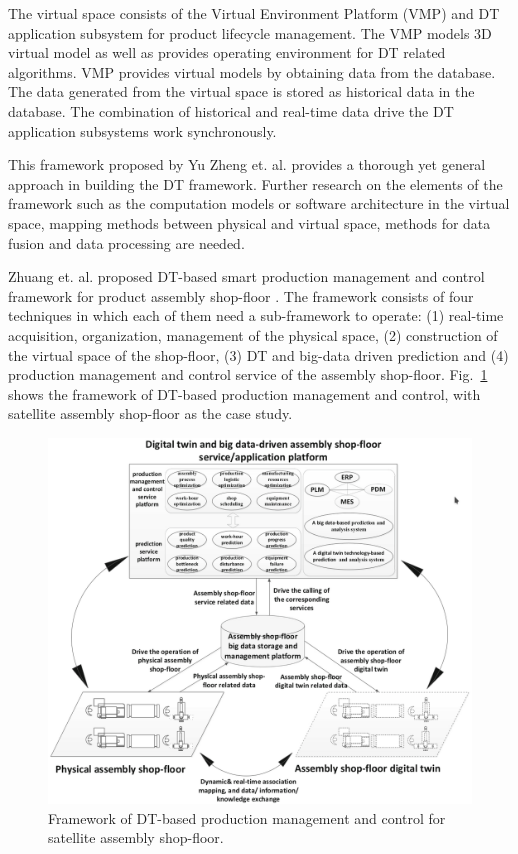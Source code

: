 \documentclass[article]{aaltoseries}
\begin{document}
The virtual space consists of the Virtual Environment Platform (VMP) and DT application subsystem for product lifecycle management. The VMP models 3D virtual model as well as provides operating environment for DT related algorithms. VMP provides virtual models by obtaining data from the database. The data generated from the virtual space is stored as historical data in the database. The combination of historical and real-time data drive the DT application subsystems work synchronously.

This framework proposed by Yu Zheng et. al. provides a thorough yet general approach in building the DT framework. Further research on the elements of the framework such as the computation models or software architecture in the virtual space, mapping methods between physical and virtual space, methods for data fusion and data processing are needed.

Zhuang et. al. proposed DT-based smart production management and control framework for product assembly shop-floor \cite{Zhuang2018}. The framework consists of four techniques in which each of them need a sub-framework to operate: (1) real-time acquisition, organization, management of the physical space, (2) construction of the virtual space of the shop-floor, (3) DT and big-data driven prediction and (4) production management and control service of the assembly shop-floor. Fig.~\ref{fig:zhuang_framework} shows the framework of DT-based production management and control, with satellite assembly shop-floor as the case study.

\begin{figure}[t!]
	\begin{center}
		\includegraphics[width=1\textwidth]{figures/zhuang_dt_framework}
		\caption{Framework of DT-based production management and control for satellite assembly shop-floor. \cite{Zhuang2018}}
		\label{fig:zhuang_framework}
	\end{center}
\end{figure}
\end{document}
